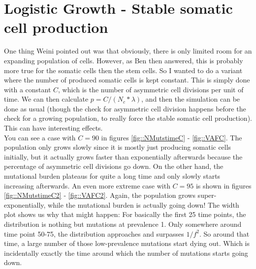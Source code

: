 \documentclass{article}
\numberwithin{equation}{subsection}
\begin{document}
	\section{Logistic Growth - Stable somatic cell production}
	
	One thing Weini pointed out was that obviously, there is only limited room for an expanding population of cells. However, as Ben then answered, this is probably more true for the somatic cells then the stem cells. So I wanted to do a variant where the number of produced somatic cells is kept constant. This is simply done with a constant $ C $, which is the number of asymmetric cell divisions per unit of time. We can then calculate $ p = C/(N_c*\lambda)$, and then the simulation can be done as usual (though the check for asymmetric cell division happens before the check for a growing population, to really force the stable somatic cell production). This can have interesting effects.\\
	You can see a case with $ C = 90 $ in figures \ref{fig::NMutstimeC} - \ref{fig::VAFC}. The population only grows slowly since it is mostly just producing somatic cells initially, but it actually grows faster than exponentially afterwards because the percentage of asymmetric cell divisions go down. On the other hand, the mutational burden plateaus for quite a long time and only slowly starts increasing afterwards.
	An even more extreme case with $ C = 95$ is shown in figures \ref{fig::NMutstimeC2} - \ref{fig::VAFC2}. Again, the population grows super-exponentially, while the mutational burden is actually going down! The width plot shows us why that might happen: For basically the first 25 time points, the distribution is nothing but mutations at prevalence 1. Only somewhere around time point 50-75, the distribution approaches and surpasses $ 1/f^2$. So around that time, a large number of those low-prevalence mutations start dying out. Which is incidentally exactly the time around which the number of mutations starts going down.
	
\end{document}
